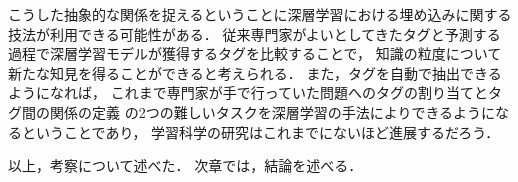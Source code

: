 こうした抽象的な関係を捉えるということに深層学習における埋め込みに関する技法が利用できる可能性がある．
従来専門家がよいとしてきたタグと予測する過程で深層学習モデルが獲得するタグを比較することで，
知識の粒度について新たな知見を得ることができると考えられる．
また，タグを自動で抽出できるようになれば，
これまで専門家が手で行っていた問題へのタグの割り当てとタグ間の関係の定義
の2つの難しいタスクを深層学習の手法によりできるようになるということであり，
学習科学の研究はこれまでにないほど進展するだろう．








\vvspace
以上，考察について述べた．
次章では，結論を述べる．
